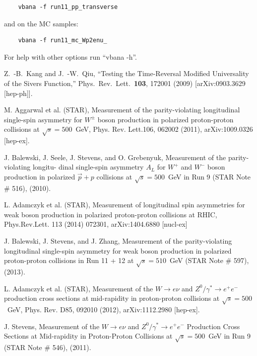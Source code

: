 \documentclass[12pt]{article}
\begin{document}
\begin{lstlisting}
    vbana -f run11_pp_transverse
\end{lstlisting}

and on the MC samples:

\begin{lstlisting}
    vbana -f run11_mc_Wp2enu_
\end{lstlisting}

For help with other options run ``vbana -h''.

\newpage

\begin{thebibliography}{9}


  Z.~-B.~Kang and J.~-W.~Qiu,
  ``Testing the Time-Reversal Modified Universality of the Sivers Function,''
  Phys.\ Rev.\ Lett.\  {\bf 103}, 172001 (2009)
  [arXiv:0903.3629 [hep-ph]].

M. Aggarwal et al. (STAR), Measurement of the parity-violating longitudinal single-spin asymmetry
for $W^{\pm}$ boson production in polarized proton-proton collisions at $\sqrt{s} = 500$~GeV, 
Phys. Rev. Lett.106, 062002 (2011), 
arXiv:1009.0326 [hep-ex].

J. Balewski, J. Seele, J. Stevens, and O. Grebenyuk, Measurement of the parity-violating longitu-
dinal single-spin asymmetry $A_{L}$ for $W^{+}$ and $W^{-}$ boson production in polarized $\vec{p} + p$ collisions at
$\sqrt{s}=500$~GeV in Run 9 (STAR Note \# 516), (2010).

L. Adamczyk et al. (STAR), Measurement of longitudinal spin asymmetries for weak boson production in polarized proton-proton collisions at RHIC, 
Phys.Rev.Lett. 113 (2014) 072301, 
arXiv:1404.6880 [nucl-ex]

J. Balewski, J. Stevens, and J. Zhang, Measurement of the parity-violating longitudinal single-spin
asymmetry for weak boson production in polarized proton-proton collisions in Run 11 + 12 at
$\sqrt{s} = 510$~GeV (STAR Note \# 597), (2013).

L. Adamczyk et al. (STAR), Measurement of the $W\rightarrow e\nu$ and $Z^{0}/\gamma^{*}\rightarrow e^{+}e^{-}$ 
production cross sections at mid-rapidity in proton-proton collisions at
$\sqrt{s} = 500$~GeV, 
Phys. Rev. D85, 092010 (2012), 
arXiv:1112.2980 [hep-ex].

J. Stevens, Measurement of the $W\rightarrow e\nu$ and $Z^{0}/\gamma^{*}\rightarrow e^{+}e^{-}$  
Production Cross Sections at Mid-rapidity in Proton-Proton Collisions at
$\sqrt{s}=500$~GeV in Run 9 (STAR Note \# 546), (2011).


\end{thebibliography}
\end{document}
